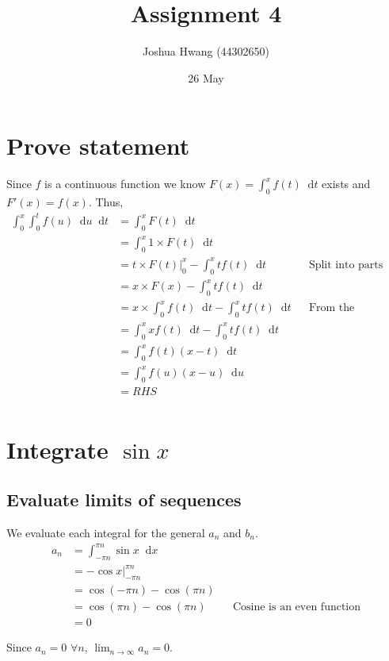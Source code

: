 \documentclass{article}
\title{Assignment 4}
\author{Joshua Hwang (44302650)}
\date{26 May}
\newcommand{\diff}{\mathop{}\!\mathrm{d}}
\begin{document}
\maketitle

\section{Prove statement}
Since $f$ is a continuous function we know $F(x) = \int_0^x f(t) \diff t$
exists and $F'(x) = f(x)$. Thus,
\begin{align*}
    \int_0^x \int_0^t f(u) \diff u \diff t
    &= \int_0^x F(t) \diff t \\
    &= \int_0^x 1 \times F(t) \diff t \\
    &= t \times F(t) \Big|_0^x - \int_0^x tf(t) \diff t
    && \text{Split into parts} \\
    &= x \times F(x) - \int_0^x tf(t) \diff t \\
    &= x \times \int_0^x f(t) \diff t - \int_0^x tf(t) \diff t
    && \text{From the statement we made above} \\
    &= \int_0^x xf(t) \diff t - \int_0^x tf(t) \diff t \\
    &= \int_0^x f(t)(x-t) \diff t \\
    &= \int_0^x f(u)(x-u) \diff u \\
    &= RHS \\
\end{align*}

\section{Integrate $\sin x$}
\subsection{Evaluate limits of sequences}
We evaluate each integral for the general $a_n$ and $b_n$.
\begin{align*}
    a_n &= \int_{-\pi n}^{\pi n} \sin x \diff x \\
    &= -\cos x \Big|_{-\pi n}^{\pi n} \\
    &= \cos (-\pi n) - \cos (\pi n) \\
    &= \cos (\pi n) - \cos (\pi n)
    && \text{Cosine is an even function} \\
    &= 0
\end{align*}

Since $a_n = 0$ $\forall n$, $\lim_{n \to \infty} a_n = 0$.
\end{document}
